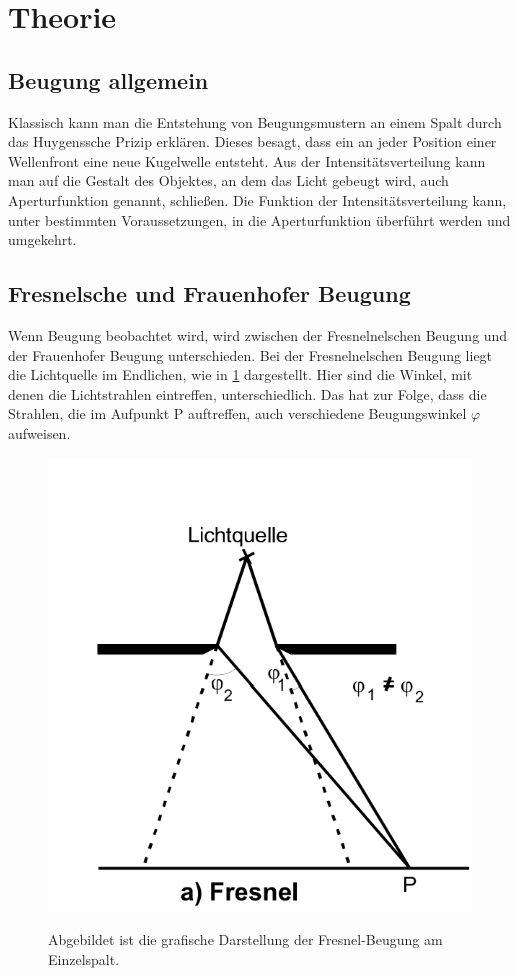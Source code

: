 \section{Theorie}
\label{sec:Theorie}
\subsection{Beugung allgemein}
Klassisch kann man die Entstehung von Beugungsmustern an einem Spalt durch das Huygenssche Prizip erklären.
Dieses besagt, dass ein an jeder Position einer Wellenfront eine neue Kugelwelle entsteht.
Aus der Intensitätsverteilung kann man auf die Gestalt des Objektes, an dem das Licht gebeugt wird, auch Aperturfunktion genannt, schließen.
Die Funktion der Intensitätsverteilung kann, unter bestimmten Voraussetzungen, in die Aperturfunktion überführt werden und umgekehrt.

\subsection{Fresnelsche und Frauenhofer Beugung}
Wenn Beugung beobachtet wird, wird zwischen der Fresnelnelschen Beugung und der Frauenhofer Beugung unterschieden.
Bei der Fresnelnelschen Beugung liegt die Lichtquelle im Endlichen, wie in \ref{fig:Fresnel} dargestellt.
Hier sind die Winkel, mit denen die Lichtstrahlen eintreffen, unterschiedlich. 
Das hat zur Folge, dass die Strahlen, die im Aufpunkt P auftreffen, auch verschiedene Beugungswinkel $\varphi$ aufweisen.

\begin{figure}[H]
    \centering
    \caption{Abgebildet ist die grafische Darstellung der Fresnel-Beugung am Einzelspalt.}
    \includegraphics{Bilder/Fresnel.png}
    \label{fig:Fresnel}
\end{figure}

